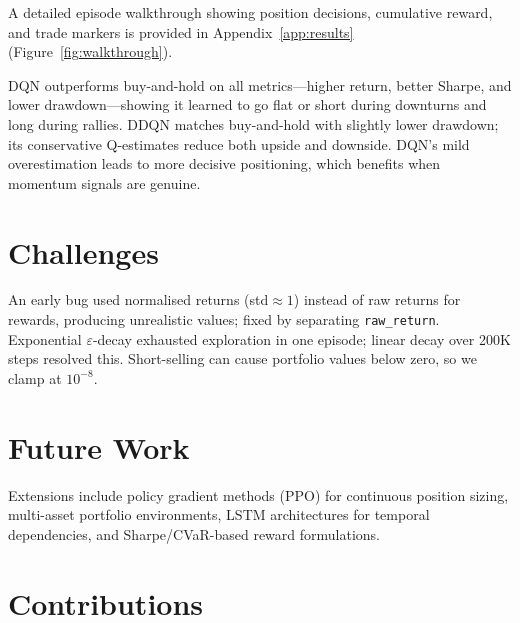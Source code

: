 \documentclass[11pt,twocolumn]{article}
\begin{document}
A detailed episode walkthrough showing position decisions, cumulative reward, and trade markers is provided in Appendix~\ref{app:results} (Figure~\ref{fig:walkthrough}).

DQN outperforms buy-and-hold on all metrics---higher return, better Sharpe, and lower drawdown---showing it learned to go flat or short during downturns and long during rallies.
DDQN matches buy-and-hold with slightly lower drawdown; its conservative Q-estimates reduce both upside and downside.
DQN's mild overestimation leads to more decisive positioning, which benefits when momentum signals are genuine.

\section{Challenges}

An early bug used normalised returns (std${\approx}1$) instead of raw returns for rewards, producing unrealistic values; fixed by separating \texttt{raw\_return}.
Exponential $\varepsilon$-decay exhausted exploration in one episode; linear decay over 200K steps resolved this.
Short-selling can cause portfolio values below zero, so we clamp at $10^{-8}$.

\section{Future Work}

Extensions include policy gradient methods (PPO) for continuous position sizing, multi-asset portfolio environments, LSTM architectures for temporal dependencies, and Sharpe/CVaR-based reward formulations.

\section{Contributions}
\end{document}
